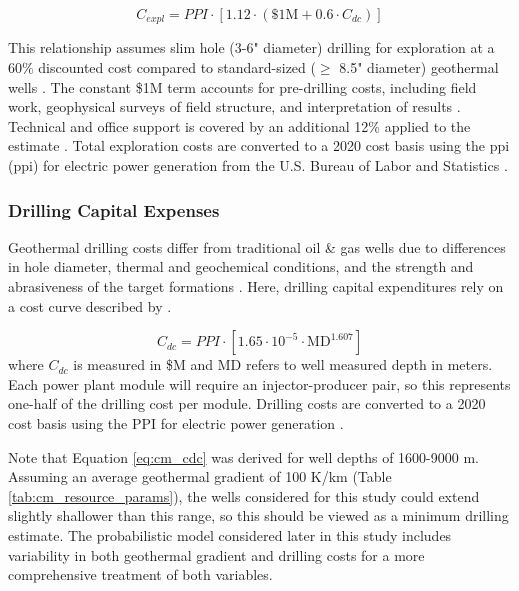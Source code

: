 \begin{equation}
\label{eq:cm_capex_expl}
    C_{expl} = PPI \cdot \left[ 1.12 \cdot (\$1\text{M} + 0.6\cdot C_{dc}) \right]
\end{equation}

This relationship assumes slim hole (3-6" diameter) drilling for exploration at a 60\% discounted cost compared to standard-sized ($\geq$ 8.5" diameter) geothermal wells \citep{eere_getem_2012}. The constant \$1M term accounts for pre-drilling costs, including field work, geophysical surveys of field structure, and interpretation of results \citep{eere_getem_2012}. Technical and office support is covered by an additional 12\% applied to the estimate \citep{eere_getem_2012}. Total exploration costs are converted to a 2020 cost basis using the \acrlong{ppi} (\acrshort{ppi}) for electric power generation from the U.S. Bureau of Labor and Statistics \citep{us_bls_ppi_2021}.

\subsubsection{Drilling Capital Expenses} \label{ch4:cm_capex_dc}
Geothermal drilling costs differ from traditional oil \& gas wells due to differences in hole diameter, thermal and geochemical conditions, and the strength and abrasiveness of the target formations \citep{lowry_geovision_2017}. Here, drilling capital expenditures rely on a cost curve described by \citet[Eq. 4,\ ][]{beckers_introducing_2013}.

\begin{equation}
\label{eq:cm_cdc}
    C_{dc} = PPI \cdot \left[ 1.65 \cdot 10^{-5} \cdot \text{MD}^{1.607} \right]
\end{equation}
where $C_{dc}$ is measured in \$M and MD refers to well measured depth in meters. Each power plant module will require an injector-producer pair, so this represents one-half of the drilling cost per module. Drilling costs are converted to a 2020 cost basis using the PPI for electric power generation \citep{us_bls_ppi_2021}. 

Note that Equation \ref{eq:cm_cdc} was derived for well depths of 1600-9000 m. Assuming an average geothermal gradient of 100 K/km (Table \ref{tab:cm_resource_params}), the wells considered for this study could extend slightly shallower than this range, so this should be viewed as a minimum drilling estimate. The probabilistic model considered later in this study includes variability in both geothermal gradient and drilling costs for a more comprehensive treatment of both variables.

